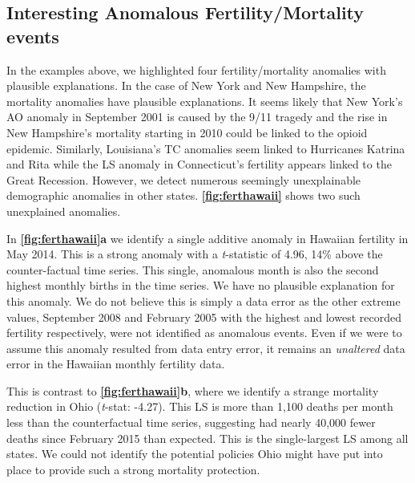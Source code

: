 \documentclass[12pt]{article}
\begin{document}
\hypertarget{interesting-anomalous-fertilitymortality-events}{%
\subsection{Interesting Anomalous Fertility/Mortality
events}\label{interesting-anomalous-fertilitymortality-events}}

In the examples above, we highlighted four fertility/mortality anomalies
with plausible explanations. In the case of New York and New Hampshire,
the mortality anomalies have plausible explanations. It seems likely
that New York's AO anomaly in September 2001 is caused by the 9/11
tragedy and the rise in New Hampshire's mortality starting in 2010 could
be linked to the opioid epidemic. Similarly, Louisiana's TC anomalies
seem linked to Hurricanes Katrina and Rita while the LS anomaly in
Connecticut's fertility appears linked to the Great Recession. However,
we detect numerous seemingly unexplainable demographic anomalies in
other states. \textbf{\autoref{fig:ferthawaii}} shows two such
unexplained anomalies.

In \textbf{\autoref{fig:ferthawaii}a} we identify a single additive
anomaly in Hawaiian fertility in May 2014. This is a strong anomaly with
a \emph{t}-statistic of 4.96, 14\% above the counter-factual time
series. This single, anomalous month is also the second highest monthly
births in the time series. We have no plausible explanation for this
anomaly. We do not believe this is simply a data error as the other
extreme values, September 2008 and February 2005 with the highest and
lowest recorded fertility respectively, were not identified as anomalous
events. Even if we were to assume this anomaly resulted from data entry
error, it remains an \emph{unaltered} data error in the Hawaiian monthly
fertility data.

This is contrast to \textbf{\autoref{fig:ferthawaii}b}, where we
identify a strange mortality reduction in Ohio (\emph{t}-stat: -4.27).
This LS is more than 1,100 deaths per month less than the counterfactual
time series, suggesting had nearly 40,000 fewer deaths since February
2015 than expected. This is the single-largest LS among all states. We
could not identify the potential policies Ohio might have put into place
to provide such a strong mortality protection.
\end{document}
